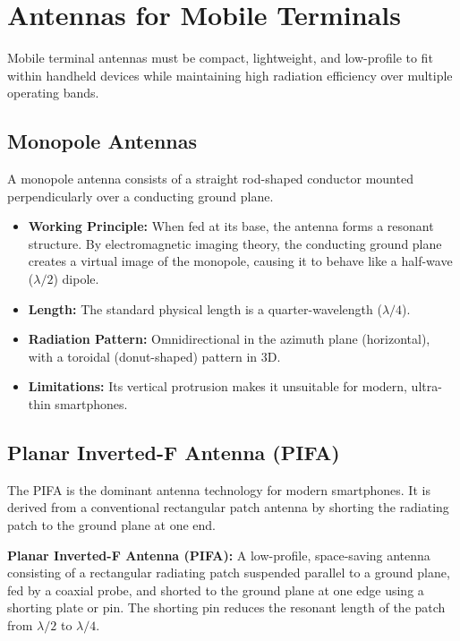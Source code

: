 \documentclass[12pt,a4paper]{article}
\begin{document}
\section{Antennas for Mobile Terminals}

Mobile terminal antennas must be compact, lightweight, and low-profile to fit within handheld devices while maintaining high radiation efficiency over multiple operating bands.

\subsection{Monopole Antennas}
A monopole antenna consists of a straight rod-shaped conductor mounted perpendicularly over a conducting ground plane.
\begin{itemize}[leftmargin=*, itemsep=3pt]
  \item \textbf{Working Principle:} When fed at its base, the antenna forms a resonant structure. By electromagnetic imaging theory, the conducting ground plane creates a virtual image of the monopole, causing it to behave like a half-wave ($\lambda/2$) dipole.
  \item \textbf{Length:} The standard physical length is a quarter-wavelength ($\lambda/4$).
  \item \textbf{Radiation Pattern:} Omnidirectional in the azimuth plane (horizontal), with a toroidal (donut-shaped) pattern in 3D.
  \item \textbf{Limitations:} Its vertical protrusion makes it unsuitable for modern, ultra-thin smartphones.
\end{itemize}

\subsection{Planar Inverted-F Antenna (PIFA)}
The PIFA is the dominant antenna technology for modern smartphones. It is derived from a conventional rectangular patch antenna by shorting the radiating patch to the ground plane at one end.

\begin{tcolorbox}[defbox]
\textbf{Planar Inverted-F Antenna (PIFA):} A low-profile, space-saving antenna consisting of a rectangular radiating patch suspended parallel to a ground plane, fed by a coaxial probe, and shorted to the ground plane at one edge using a shorting plate or pin. The shorting pin reduces the resonant length of the patch from $\lambda/2$ to $\lambda/4$.
\end{tcolorbox}
\end{document}
